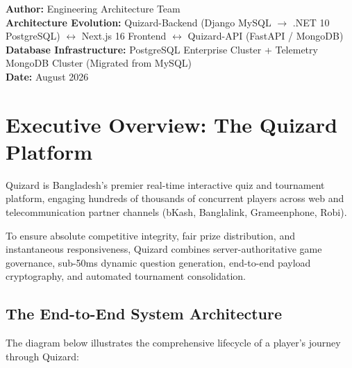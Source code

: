 \documentclass[11pt,a4paper,oneside]{report}
\begin{document}
\begin{titlepage}
    \vfill
    {\bfseries Author:} Engineering Architecture Team\\
    {\bfseries Architecture Evolution:} Quizard-Backend (Django MySQL $\longrightarrow$ .NET 10 PostgreSQL) $\longleftrightarrow$ Next.js 16 Frontend $\longleftrightarrow$ Quizard-API (FastAPI / MongoDB)\\
    {\bfseries Database Infrastructure:} PostgreSQL Enterprise Cluster + Telemetry MongoDB Cluster (Migrated from MySQL)\\
    {\bfseries Date:} August 2026
\end{titlepage}

\tableofcontents
\newpage

\chapter*{Executive Overview: The Quizard Platform}

\begin{tcolorbox}[storybox, title={Platform Mission}]
Quizard is Bangladesh's premier real-time interactive quiz and tournament platform, engaging hundreds of thousands of concurrent players across web and telecommunication partner channels (bKash, Banglalink, Grameenphone, Robi). 

To ensure absolute competitive integrity, fair prize distribution, and instantaneous responsiveness, Quizard combines server-authoritative game governance, sub-50ms dynamic question generation, end-to-end payload cryptography, and automated tournament consolidation.
\end{tcolorbox}

\section*{The End-to-End System Architecture}
The diagram below illustrates the comprehensive lifecycle of a player's journey through Quizard:
\end{document}
